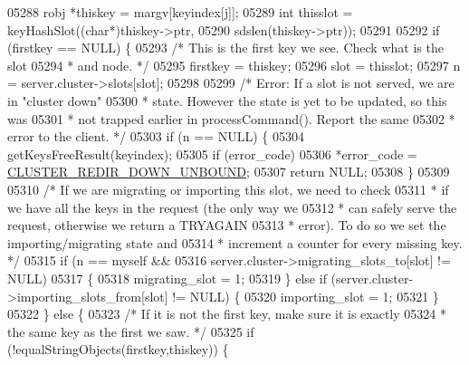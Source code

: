 \begin{DoxyCode}
{{{{{{{{{{{{{{{{{{{{{{{{{{{{{{{{{{{{{{{{{{{{{{{{{{{{{{{{{{{{{{{{{{{{{{{{{{{{{{{{{{{{{{{{{{{{{{{{{{{{{{{{{{{{{05288             robj *thiskey = margv[keyindex[j]];
05289             \textcolor{keywordtype}{int} thisslot = keyHashSlot((\textcolor{keywordtype}{char}*)thiskey->ptr,
05290                                        sdslen(thiskey->ptr));
05291 
05292             \textcolor{keywordflow}{if} (firstkey == NULL) \{
05293                 \textcolor{comment}{/* This is the first key we see. Check what is the slot}
05294 \textcolor{comment}{                 * and node. */}
05295                 firstkey = thiskey;
05296                 slot = thisslot;
05297                 n = server.cluster->slots[slot];
05298 
05299                 \textcolor{comment}{/* Error: If a slot is not served, we are in "cluster down"}
05300 \textcolor{comment}{                 * state. However the state is yet to be updated, so this was}
05301 \textcolor{comment}{                 * not trapped earlier in processCommand(). Report the same}
05302 \textcolor{comment}{                 * error to the client. */}
05303                 \textcolor{keywordflow}{if} (n == NULL) \{
05304                     getKeysFreeResult(keyindex);
05305                     \textcolor{keywordflow}{if} (error\_code)
05306                         *error\_code = \hyperlink{cluster_8h_ac77f67383a97866c21a56f66bada419b}{CLUSTER\_REDIR\_DOWN\_UNBOUND};
05307                     \textcolor{keywordflow}{return} NULL;
05308                 \}
05309 
05310                 \textcolor{comment}{/* If we are migrating or importing this slot, we need to check}
05311 \textcolor{comment}{                 * if we have all the keys in the request (the only way we}
05312 \textcolor{comment}{                 * can safely serve the request, otherwise we return a TRYAGAIN}
05313 \textcolor{comment}{                 * error). To do so we set the importing/migrating state and}
05314 \textcolor{comment}{                 * increment a counter for every missing key. */}
05315                 \textcolor{keywordflow}{if} (n == myself &&
05316                     server.cluster->migrating\_slots\_to[slot] != NULL)
05317                 \{
05318                     migrating\_slot = 1;
05319                 \} \textcolor{keywordflow}{else} \textcolor{keywordflow}{if} (server.cluster->importing\_slots\_from[slot] != NULL) \{
05320                     importing\_slot = 1;
05321                 \}
05322             \} \textcolor{keywordflow}{else} \{
05323                 \textcolor{comment}{/* If it is not the first key, make sure it is exactly}
05324 \textcolor{comment}{                 * the same key as the first we saw. */}
05325                 \textcolor{keywordflow}{if} (!equalStringObjects(firstkey,thiskey)) \{
}}}}}}}}}}}}}}}}}}}}}}}}}}}}}}}}}}}}}}}}}}}}}}}}}}}}}}}}}}}}}}}}}}}}}}}}}}}}}}}}}}}}}}}}}}}}}}}}}}}}}}}}}}}}}
\end{DoxyCode}
